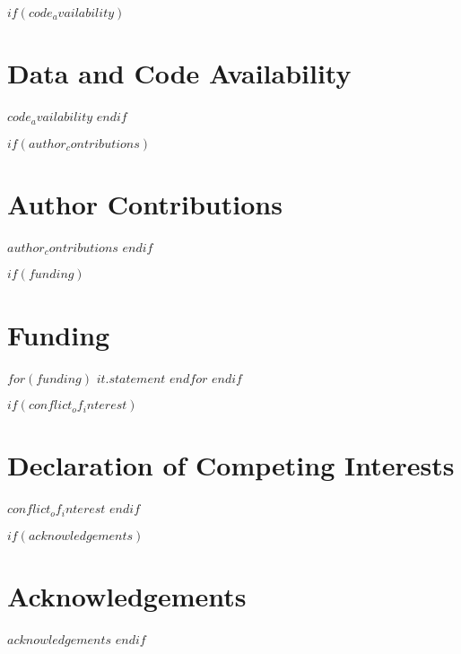 $if(code_availability)$
\section*{Data and Code Availability}

$code_availability$
$endif$

$if(author_contributions)$
\section*{Author Contributions}

$author_contributions$
$endif$

$if(funding)$
\section*{Funding}

$for(funding)$
$it.statement$
$endfor$
$endif$

$if(conflict_of_interest)$
\section*{Declaration of Competing Interests}

$conflict_of_interest$
$endif$

$if(acknowledgements)$
\section*{Acknowledgements}

$acknowledgements$
$endif$
